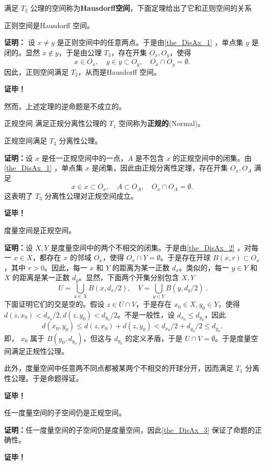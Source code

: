 满足 $T_2$ 公理的空间称为\textbf{Hausdorff空间}，下面定理给出了它和正则空间的关系
\begin{theorem}{}
正则空间是Hausdorff 空间。
\end{theorem}
\textbf{证明：}
设 $x\neq y$ 是正则空间中的任意两点。于是由\autoref{the_DisAx_1} ，单点集 $y$ 是闭的。显然 $x\notin y$，于是由公理 $T_3$，存在开集 $O_x,O_y$，使得
\begin{equation}
x\in O_x, \quad y\in y\subset O_y, \quad O_x\cap O_y=\emptyset.~
\end{equation}
因此，正则空间满足 $T_2$，从而是Hausdorff 空间。

\textbf{证毕！}

然而，上述定理的逆命题是不成立的。


\begin{definition}{正规空间}
满足正规分离性公理的 $T_1$ 空间称为\textbf{正规的}(Normal)。
\end{definition}

\begin{theorem}{}\label{the_DisAx_2}
正规空间满足 $T_3$ 分离性公理。
\end{theorem}

\textbf{证明：}设 $x$ 是任一正规空间中的一点，$A$ 是不包含 $x$ 的正规空间中的闭集。由\autoref{the_DisAx_1} ，单点集 $x$ 是闭集，因此由正规分离性定理，存在开集 $O_x,O_A$ 满足
\begin{equation}
x\in x\subset O_x, \quad A\subset O_A,\quad O_x\cap O_A=\emptyset.~ 
\end{equation}
这表明了 $T_3$ 分离性公理对正规空间成立。

\textbf{证毕！}

\begin{theorem}{}\label{the_DisAx_3}
度量空间是正规空间。
\end{theorem}

\textbf{证明：}设 $X,Y$ 是度量空间中的两个不相交的闭集。于是由\autoref{the_DisAx_2} ，对每一 $x\in X$，都存在 $x$ 的邻域 $O_x$，使得 $O_x\cap Y=\emptyset$。于是存在开球 $B(x,r)\subset O_x$，其中 $r>0$。因此，每一 $x$ 和 $Y$ 的距离为某一正数 $d_x$。类似的，每一 $y\in Y$ 和 $X$ 的距离是某一正数 $d_y$。显然，下面两个开集分别包含 $X,Y$
\begin{equation}
U=\bigcup_{x\in X} B(x,d_x/2),\quad V=\bigcup_{y\in Y} B(y,d_y/2)~.
\end{equation}
下面证明它们的交是空的。假设 $z\in U\cap V$，于是存在 $x_0\in X,y_0\in Y$，使得 $d(z,x_0)<d_{x_0}/2,d(z,y_0)<d_{y_0}/2$。不是一般性，设 $d_{x_0}\leq d_{y_0}$，因此
\begin{equation}
d(x_0,y_0)\leq d(z,x_0)+d(z,y_0)<d_{x_0}/2+d_{y_0}/2\leq d_{y_0}.~
\end{equation}
即， $x_0$ 属于 $B(y_0,d_{y_0})$，但这与 $d_{y_0}$ 的定义矛盾，于是 $U\cap V=\emptyset$。于是度量空间满足正规性公理。

此外，度量空间中任意两不同点都被某两个不相交的开球分开，因而满足 $T_1$ 分离性公理。于是命题得证。

\textbf{证毕！}

\begin{corollary}{}
任一度量空间的子空间仍是正规空间。
\end{corollary}
\textbf{证明：}任一度量空间的子空间仍是度量空间，因此\autoref{the_DisAx_3} 保证了命题的正确性。

\textbf{证毕！}

